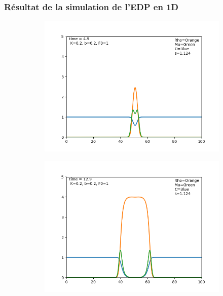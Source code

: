\documentclass[11pt]{article}
\begin{document}
\subsubsection{Résultat de la simulation de l'EDP en 1D}
\begin{figure}[hbt!]
\centering
\begin{subfigure}[b]{0.45\textwidth}
\includegraphics[width=\textwidth]{Latex/edp_1d_0.png}
\end{subfigure}
\begin{subfigure}[b]{0.45\textwidth}
\includegraphics[width=\textwidth]{Latex/edp_1d_1.png}
\end{subfigure}
\begin{subfigure}[b]{0.45\textwidth}

\end{subfigure}
\end{figure}
\end{document}
